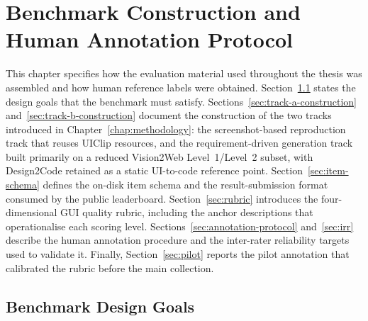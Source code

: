 %

\chapter{Benchmark Construction and Human Annotation Protocol}
\label{chap:benchmark}

This chapter specifies how the evaluation material used throughout the
thesis was assembled and how human reference labels were obtained.
Section~\ref{sec:bench-goals} states the design goals that the benchmark
must satisfy. Sections~\ref{sec:track-a-construction}
and~\ref{sec:track-b-construction} document the construction of the two
tracks introduced in Chapter~\ref{chap:methodology}: the screenshot-based
reproduction track that reuses UIClip resources, and the
requirement-driven generation track built primarily on a reduced
Vision2Web Level~1/Level~2 subset, with Design2Code retained as a
static UI-to-code reference point. Section~\ref{sec:item-schema} defines the
on-disk item schema and the result-submission format consumed by the
public leaderboard. Section~\ref{sec:rubric} introduces the four-dimensional
GUI quality rubric, including the anchor descriptions that operationalise
each scoring level. Sections~\ref{sec:annotation-protocol}
and~\ref{sec:irr} describe the human annotation procedure and the
inter-rater reliability targets used to validate it. Finally,
Section~\ref{sec:pilot} reports the pilot annotation that calibrated the
rubric before the main collection.

\section{Benchmark Design Goals}
\label{sec:bench-goals}

